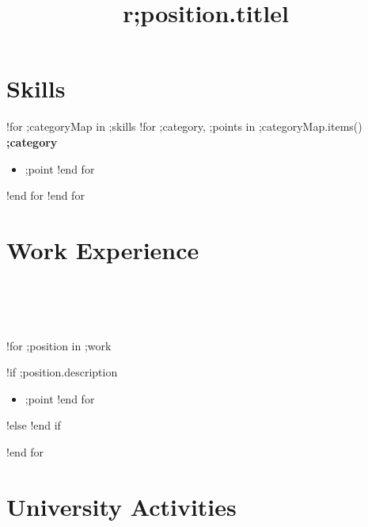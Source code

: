 \documentclass[margin,line]{res}
\begin{document}
\begin{sloppypar} %

\address{;contact.phone\hspace{1cm};contact.email}

\begin{resume}

\section{Skills}
!for ;categoryMap in ;skills
    !for ;category, ;points in ;categoryMap.items()
        {\bf ;category}
        \begin{itemize}
        !for ;point in ;points
            \item ;point
        !end for
        \end{itemize}
    !end for
!end for


\section {Work Experience}

\begin{format}
  \title{r}\\
  \\
  \body\\
\end{format}

!for ;position in ;work
    \title{;position.title}
    \begin{position}
        \vspace{-.3cm}
        !if ;position.description
            \begin{itemize}
            !for ;point in ;position.description
                \item ;point
            !end for
            \end{itemize}
        !else
            \vspace{-.2cm}
        !end if
    \end{position}
!end for


\section {University Activities}

\begin{format}
  \title{l}\\
  \body\\
\end{format}


\end{resume}
\end{sloppypar}
\end{document}
